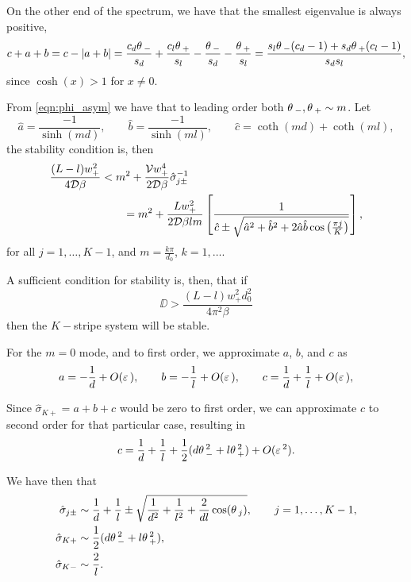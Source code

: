 On the other end of the spectrum, we have that the smallest eigenvalue is always positive,
% 
\[
  c+a+b = c-|a+b| = \frac{c_d\theta\,_-}{s_d}+\frac{c_l\theta\,_+}{s_l}-\frac{\theta\,_-}{s_d}-\frac{\theta\,_+}{s_l} = \frac{s_l\theta\,_-(c_d-1) + s_d\theta\,_+(c_l-1)}{s_ds_l},
\]
% 
since $\cosh(x)>1$ for $x\neq0$.

From \eqref{eqn:phi_asym} we have that to leading order both $\theta\,_-,\theta\,_+\sim m$. Let
% 
\[
 \hat{a} = \frac{-1}{\sinh(md)}, \qquad \hat{b} = \frac{-1}{\sinh(ml)},\qquad \hat{c} = \coth(md)+\coth(ml),
\]
% 
the stability condition is, then
% 
\begin{equation*}
\begin{split}
\begin{aligned}
  \frac{(L-l)w_+^2}{4\mathcal{D}\beta} &< m^2 + \frac{\mathcal{V} w_+^4}{2\mathcal{D}\beta}\hat\sigma_{j\pm}^{-1}\\
  &\qquad = m^2 + \frac{L w_+^2}{2\mathcal{D}\beta lm}\left[\frac{1}{\hat{c}\pm \sqrt{\hat{a}^2+\hat{b}^2+2\hat{a}\hat{b}\cos\left(\frac{\pi j}{K}\right)}}\right],
\end{aligned}
\end{split}
\end{equation*}
% 
for all $j=1,\hdots,K-1$, and $m=\frac{k\pi}{d_0}$, $k=1,\hdots$.

A sufficient condition for stability is, then, that if
%
\begin{equation*}
 \DD > \frac{(L-l)w_+^2d_0^2}{4\pi^2\beta}
\end{equation*}
% 
then the $K-$stripe system will be stable.

For the $m=0$ mode, and to first order, we approximate $a$, $b$, and $c$ as
% 
\[
  a=-\frac{1}{d}+O(\varepsilon\,),\qquad b = -\frac{1}{l}+O(\varepsilon\,),\qquad c=\frac{1}{d}+\frac{1}{l}+O(\varepsilon\,),
\]
% 

Since $\hat\sigma_{K+}= a+b+c$ would be zero to first order, we can approximate $c$ to second order for that particular case, resulting in 
% 
\[
  c=\frac{1}{d}+\frac{1}{l}+\frac{1}{2}(d\theta\,_-^2+l\theta\,_+^2)+O(\varepsilon\,^2).
\]


We have then that
%
\[
\begin{align}
  \hat\sigma_{j\pm} &\sim \frac{1}{d}+\frac{1}{l}\pm\sqrt{\frac{1}{d^2}+\frac{1}{l^2}+\frac{2}{dl}\cos(\theta\,_j)},\qquad j=1,\hdots,K-1,\\
  \hat\sigma_{K+} &\sim \frac{1}{2}(d\theta\,_-^2+l\theta\,_+^2),\\
  \hat\sigma_{K-} &\sim \frac{2}{l}.
\end{align}
\]
% 

